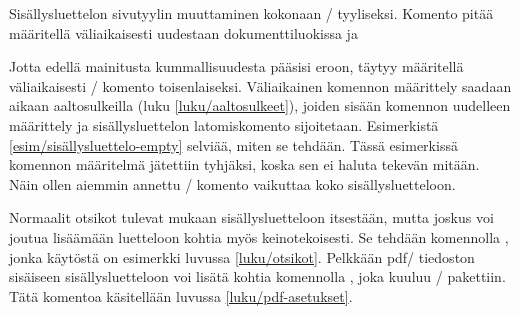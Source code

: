 \begin{esimerkki*}

\begin{koodilohko}
\pagestyle{empty}
{
  \renewcommand{\thispagestyle}[1]{} %
  \tableofcontents
}
\end{koodilohko}
  \caption{Sisällysluettelon sivutyylin muuttaminen kokonaan
    \-/ tyyliseksi. Komento  pitää
    määritellä väliaikaisesti uudestaan dokumenttiluokissa 
    ja }
  \label{esim/sisällysluettelo-empty}
\end{esimerkki*}

Jotta edellä mainitusta kummallisuudesta pääsisi eroon, täytyy
määritellä väliaikaisesti \-/ komento
toisenlaiseksi. Väliaikainen komennon määrittely saadaan aikaan
aaltosulkeilla (luku \ref{luku/aaltosulkeet}), joiden sisään komennon
uudelleen määrittely ja sisällysluettelon latomiskomento sijoitetaan.
Esimerkistä \ref{esim/sisällysluettelo-empty} selviää, miten se tehdään.
Tässä esimerkissä komennon määritelmä jätettiin tyhjäksi, koska sen ei
haluta tekevän mitään. Näin ollen aiemmin annettu \-/
komento vaikuttaa koko sisällysluetteloon.

Normaalit otsikot tulevat mukaan sisällysluetteloon itsestään, mutta
joskus voi joutua lisäämään luetteloon kohtia myös keinotekoisesti. Se
tehdään komennolla , jonka käytöstä on
esimerkki luvussa \ref{luku/otsikot}. Pelkkään pdf\-/ tiedoston
sisäiseen sisällysluetteloon voi lisätä kohtia komennolla
, joka kuuluu \-/ pakettiin.
Tätä komentoa käsitellään luvussa \ref{luku/pdf-asetukset}.

